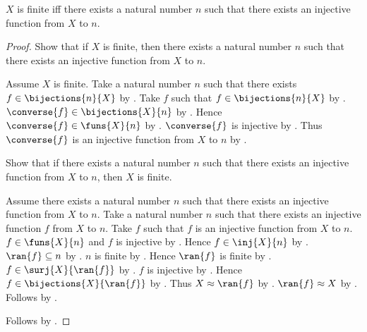 \begin{theorem}\label{finite_iff_injects_into_natural}
    $X$ is finite iff there exists a natural number $n$ such that
        there exists an injective function from $X$ to $n$.
\end{theorem}
\begin{proof}
    Show that if $X$ is finite, then there exists a natural number $n$
        such that there exists an injective function from $X$ to $n$.
    \begin{subproof}
        Assume $X$ is finite.
        Take a natural number $n$ such that there exists
            $f\in\bijections{n}{X}$ by .
        Take $f$ such that $f\in\bijections{n}{X}$ by \auto.
        $\converse{f}\in\bijections{X}{n}$
            by .
        Hence $\converse{f}\in\funs{X}{n}$
            by .
        $\converse{f}$ is injective by .
        Thus $\converse{f}$ is an injective function from $X$ to $n$
            by .
    \end{subproof}
    Show that if there exists a natural number $n$ such that
        there exists an injective function from $X$ to $n$, then
        $X$ is finite.
    \begin{subproof}
        Assume there exists a natural number $n$ such that
            there exists an injective function from $X$ to $n$.
        Take a natural number $n$ such that there exists an injective
            function $f$ from $X$ to $n$.
        Take $f$ such that $f$ is an injective function from $X$ to $n$.
        $f\in\funs{X}{n}$ and $f$ is injective
            by .
        Hence $f\in\inj{X}{n}$
            by .
        $\ran{f}\subseteq n$ by .
        $n$ is finite by .
        Hence $\ran{f}$ is finite by .
        $f\in\surj{X}{\ran{f}}$ by .
        $f$ is injective
            by .
        Hence $f\in\bijections{X}{\ran{f}}$ by .
        Thus $X\approx\ran{f}$ by .
        $\ran{f}\approx X$ by .
        Follows by .
    \end{subproof}
    Follows by \auto.
\end{proof}

